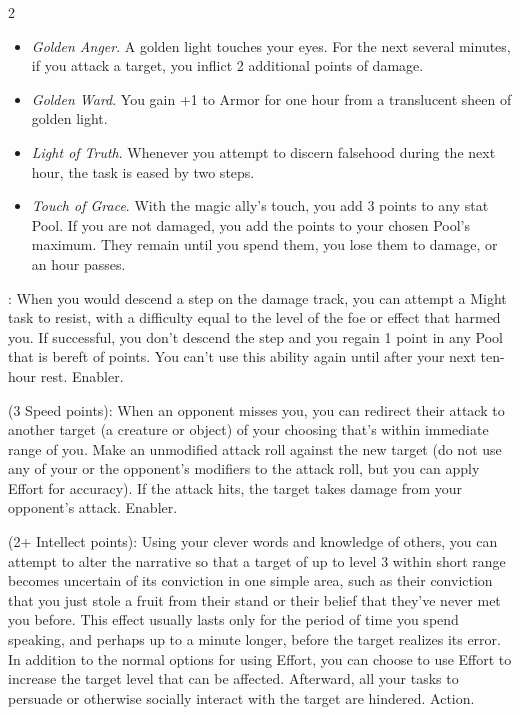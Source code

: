 \begin{multicols}{2}
\begin{itemize} 
\item \textit{Golden Anger}. A golden light touches your eyes. For the next several minutes, if you attack a target, you inflict 2 additional points of damage. 
\item \textit{Golden Ward}. You gain +1 to Armor for one hour from a translucent sheen of golden light. 
\item \textit{Light of Truth}. Whenever you attempt to discern falsehood during the next hour, the task is eased by two steps. 
\item \textit{Touch of Grace}. With the magic ally’s touch, you add 3 points to any stat Pool. If you are not damaged, you add the points to your chosen Pool’s maximum. They remain until you spend them, you lose them to damage, or an hour passes. 
\end{itemize} 
 
: When you would descend a step on the damage track, you can attempt a Might task to resist, with a difficulty equal to the level of the foe or effect that harmed you. If successful, you don’t descend the step and you regain 1 point in any Pool that is bereft of points. You can’t use this ability again until after your next ten-hour rest. Enabler. 
 
 (3 Speed points): When an opponent misses you, you can redirect their attack to another target (a creature or object) of your choosing that’s within immediate range of you. Make an unmodified attack roll against the new target (do not use any of your or the opponent’s modifiers to the attack roll, but you can apply Effort for accuracy). If the attack hits, the target takes damage from your opponent’s attack. Enabler. 
 
 (2+ Intellect points): Using your clever words and knowledge of others, you can attempt to alter the narrative so that a target of up to level 3 within short range becomes uncertain of its conviction in one simple area, such as their conviction that you just stole a fruit from their stand or their belief that they’ve never met you before. This effect usually lasts only for the period of time you spend speaking, and perhaps up to a minute longer, before the target realizes its error. In addition to the normal options for using Effort, you can choose to use Effort to increase the target level that can be affected. Afterward, all your tasks to persuade or otherwise socially interact with the target are hindered. Action. 


\end{multicols}
